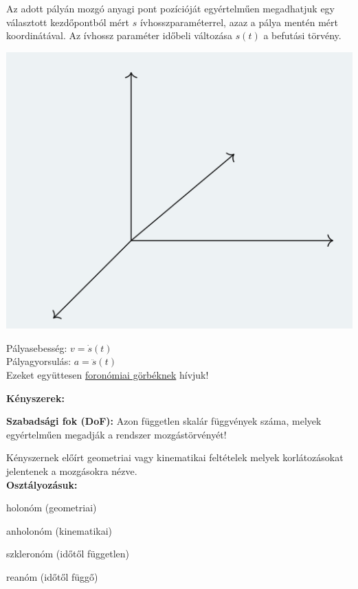 \begin{tcolorbox}[colback=MidnightBlue!5!white,colframe=MidnightBlue!60!black,title= Definíció]
Az adott pályán mozgó anyagi pont pozícióját egyértelműen megadhatjuk egy választott kezdőpontból mért \(s\) ívhosszparaméterrel, azaz a pálya mentén mért koordinátával. Az ívhossz paraméter időbeli változása \(s(t)\) a befutási törvény.
\begin{multicols}{2}
    \includegraphics[scale = 0.7]{Ea_gyak_1/2.png}
    \columnbreak

  Pályasebesség: \(v=\dot{s}(t)\)\\
  Pályagyorsulás: \(a = \ddot{s}(t)\)\\
  Ezeket együttesen \underline{foronómiai görbéknek} hívjuk!
\end{multicols}
\end{tcolorbox}
\newpage
\textbf{Kényszerek:}
\begin{tcolorbox}[colback=MidnightBlue!5!white,colframe=MidnightBlue!60!black,title= Definíció]
    \textbf{Szabadsági fok (DoF):} Azon független skalár függvények száma, melyek egyértelműen megadják a rendszer mozgástörvényét!
    \end{tcolorbox}
\begin{tcolorbox}[colback=MidnightBlue!5!white,colframe=MidnightBlue!60!black,title= Definíció]
    Kényszernek előírt geometriai vagy kinematikai feltételek melyek korlátozásokat jelentenek a mozgásokra nézve.\\
    \textbf{Osztályozásuk:}
    \begin{itemize}
        \begin{multicols}{2}
        \item holonóm (geometriai)
        \item anholonóm (kinematikai)
        
        \columnbreak
        \item szkleronóm (időtől független)
        \item reanóm (időtől függő)
        \end{multicols}
    \end{itemize}
\end{tcolorbox}
